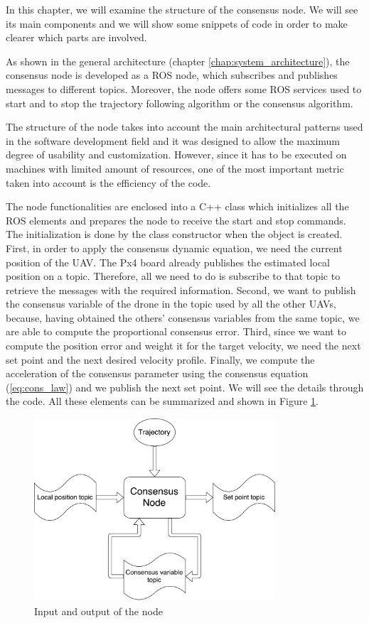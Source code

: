 In this chapter, we will examine the structure of the consensus node. We will see
its main components and we will show some snippets of code
in order to make clearer which parts are involved.

As shown in the general architecture (chapter \ref{chap:system_architecture}),
the consensus node is developed as a ROS node, which subscribes and publishes messages
to different topics.
Moreover, the node offers some ROS services used to start and to stop the trajectory
following algorithm or the consensus algorithm.

The structure of the node takes into account the main architectural patterns used
in the software development field and it was designed to allow the maximum degree
of usability and customization. However, since it has to be executed on
machines with limited amount of resources, one of the most important metric taken
into account is the efficiency of the code.

The node functionalities are enclosed into a C++ class which initializes
all the ROS elements and prepares the node to receive the start and stop commands.
The initialization is done by the class constructor when the object is created.
First, in order to apply the consensus dynamic equation, we need
the current position of the UAV. The Px4 board already publishes the estimated
local position on a topic.
Therefore, all we need to do is subscribe to that topic to retrieve the messages
with the required information.
Second, we want to publish the consensus variable of the drone in the topic used
by all the other UAVs, because, having obtained the others' consensus variables
from the same topic, we are able to compute the proportional consensus error.
Third, since we want to compute the position error and weight
it for the target velocity, we need the next set point and the next desired velocity profile.
Finally, we compute the acceleration of the consensus parameter using the consensus equation (\ref{eq:cons_law})
and we publish the next set point. We will see the details through the code.
All these elements can be summarized and shown in Figure \ref{fig:node_in_out}.

\begin{figure}
\centering
\includegraphics[width=0.8\textwidth]{chapters/chapter-03/figures/consensus_node_structure.pdf}
\caption{Input and output of the node}
\label{fig:node_in_out}
\end{figure}

